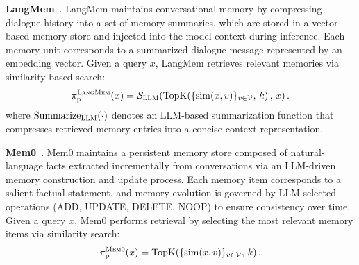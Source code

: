 \documentclass{llmxive}
\begin{document}



\textbf{LangMem}~\cite{langmem2025}.
LangMem maintains conversational memory by compressing dialogue history into a set of memory summaries, which are stored in a vector-based memory store and injected into the model context during inference.
Each memory unit corresponds to a summarized dialogue message represented by an embedding vector.
Given a query $x$, LangMem retrieves relevant memories via similarity-based search:
\begin{equation}
\pi_{\mathrm p}^{\textsc{LangMem}}(x)
=
\mathcal{S}_{\textsc{LLM}}
\!\left(
\mathrm{TopK}\!\left(\{\mathrm{sim}(x,v)\}_{v\in\mathcal{V}},\,k\right),
\,x
\right).
\end{equation}
where $\mathrm{Summarize}_{\textsc{LLM}}(\cdot)$ denotes an LLM-based
summarization function that compresses retrieved memory entries into
a concise context representation.

\textbf{Mem0}~\cite{DBLP:journals/corr/abs-2504-19413}.
Mem0 maintains a persistent memory store composed of natural-language facts extracted incrementally from conversations via an LLM-driven memory construction and update process.
Each memory item corresponds to a salient factual statement, and memory evolution is governed by LLM-selected operations (ADD, UPDATE, DELETE, NOOP) to ensure consistency over time.
Given a query $x$, Mem0 performs retrieval by selecting the most relevant memory items via similarity search:
\begin{equation}
\pi_{\mathrm p}^{\textsc{Mem0}}(x) = \mathrm{TopK}\!\left(\{\mathrm{sim}(x,v)\}_{v \in \mathcal{V}},\, k\right).
\end{equation}

\end{document}
